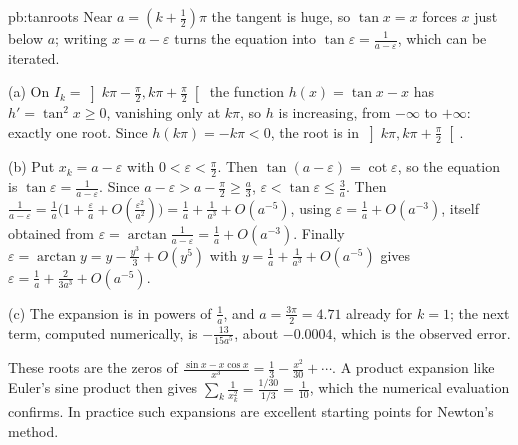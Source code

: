 \begin{solution}{pb:tanroots}
\idea Near $a=(k+\frac12)\pi$ the tangent is huge, so $\tan x=x$ forces $x$ just below $a$; writing $x=a-\varepsilon$ turns the equation into $\tan\varepsilon=\frac1{a-\varepsilon}$, which can be iterated.

\writeup (a) On $I_k=\left]k\pi-\frac\pi2,k\pi+\frac\pi2\right[$ the function $h(x)=\tan x-x$ has $h'=\tan^2x\ge0$, vanishing only at $k\pi$, so $h$ is increasing, from $-\infty$ to $+\infty$: exactly one root.
Since $h(k\pi)=-k\pi<0$, the root is in $\left]k\pi,k\pi+\frac\pi2\right[$.

(b) Put $x_k=a-\varepsilon$ with $0<\varepsilon<\frac\pi2$. Then $\tan(a-\varepsilon)=\cot\varepsilon$, so the equation is $\tan\varepsilon=\frac1{a-\varepsilon}$. Since $a-\varepsilon>a-\frac\pi2\ge\frac a3$, $\varepsilon<\tan\varepsilon\le\frac3a$. Then
$\frac1{a-\varepsilon}=\frac1a\bigl(1+\frac\varepsilon a+O(\frac{\varepsilon^2}{a^2})\bigr)=\frac1a+\frac1{a^3}+O(a^{-5})$, using $\varepsilon=\frac1a+O(a^{-3})$, itself obtained from $\varepsilon=\arctan\frac1{a-\varepsilon}=\frac1a+O(a^{-3})$. Finally
$\varepsilon=\arctan y=y-\frac{y^3}3+O(y^5)$ with $y=\frac1a+\frac1{a^3}+O(a^{-5})$ gives $\varepsilon=\frac1a+\frac2{3a^3}+O(a^{-5})$.

(c) The expansion is in powers of $\frac1a$, and $a=\frac{3\pi}2=4.71$ already for $k=1$; the next term, computed numerically, is $-\frac{13}{15a^5}$, about $-0.0004$, which is the
observed error.

\leads These roots are the zeros of $\frac{\sin x-x\cos x}{x^3}=\frac13-\frac{x^2}{30}+\cdots$. A product expansion like Euler's sine product then gives $\sum_k\frac1{x_k^2}=\frac{1/30}{1/3}=\frac1{10}$, which the
numerical evaluation confirms. In practice such expansions are excellent starting points for Newton's method.
\end{solution}

